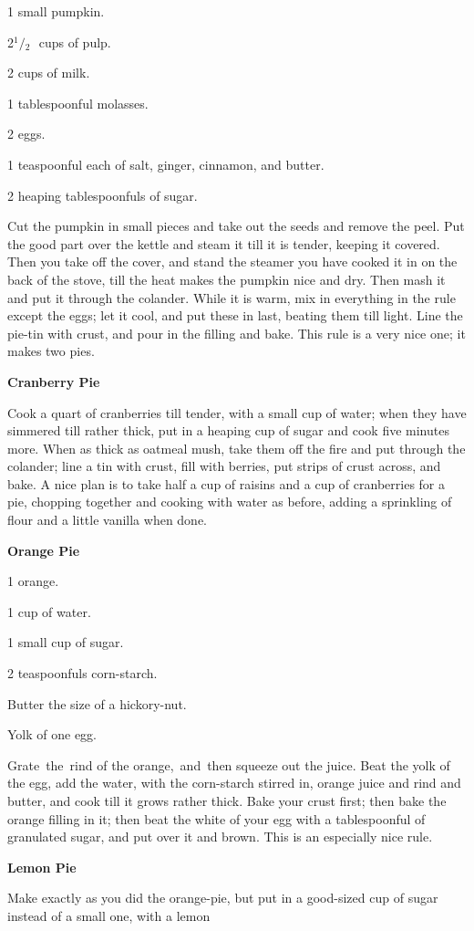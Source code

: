 \documentclass[11pt]{book}
\newcommand{\indpar}{\par\noindent\hspace*{\parindent}}
\newcommand{\ingredient}{\indpar}
\newcommand{\instruction}{\indpar}
\newcommand{\OneHalf}{\ensuremath{{}^1\!\!/\!{}_2\mbox{\ }}}
\newenvironment{RecipeTitle}{\medskip\begin{center}\large\bf }{\end{center}\smallskip}
\begin{document}
\ingredient  1 small pumpkin.
\ingredient  2\OneHalf cups of pulp.
\ingredient  2 cups of milk.
\ingredient  1 tablespoonful molasses.
\ingredient  2 eggs.
\ingredient  1 teaspoonful each of salt, ginger, cinnamon, and butter.
\ingredient  2 heaping tablespoonfuls of sugar.
\instruction  Cut the pumpkin in small pieces and take out the seeds and
remove the peel.  Put the good part over the kettle and steam
it till it is tender, keeping it covered.  Then you take off
the cover, and stand the steamer you have cooked it in on the
back of the stove, till the heat makes the pumpkin nice and
dry.  Then mash it and put it through the colander.  While it
is warm, mix in everything in the rule except the eggs; let it
cool, and put these in last, beating them till light.  Line
the pie-tin with crust, and pour in the filling and bake.
This rule is a very nice one; it makes two pies.
\begin{RecipeTitle}
Cranberry Pie\label{cranberry_pie}
\end{RecipeTitle}
\instruction  Cook a quart of cranberries till tender, with a small cup of
water; when they have simmered till rather thick, put in a
heaping cup of sugar and cook five minutes more.  When as
thick as oatmeal mush, take them off the fire and put through
the colander; line a tin with crust, fill with berries, put
strips of crust across, and bake.  A nice plan is to take half
a cup of raisins and a cup of cranberries for a pie, chopping
together and cooking with water as before, adding a sprinkling
of flour and a little vanilla when done.
\begin{RecipeTitle}
Orange Pie\label{orange_pie}
\end{RecipeTitle}
\ingredient  1 orange.
\ingredient  1 cup of water.
\ingredient  1 small cup of sugar.
\ingredient  2 teaspoonfuls corn-starch.
\ingredient  Butter the size of a hickory-nut.
\ingredient  Yolk of one egg.
\instruction  Grate\, the\, rind of the orange,\, and\, then squeeze out the juice.
Beat the yolk of the egg, add the water, with the corn-starch
stirred in, orange juice and rind and butter, and cook till it
grows rather thick.  Bake your crust first; then bake the
orange filling in it;  then beat the white of your egg with
a tablespoonful of granulated sugar, and put over it and brown.
This is an especially nice rule.
\begin{RecipeTitle}
Lemon Pie\label{lemon_pie}
\end{RecipeTitle}
\instruction  Make exactly as you did the orange-pie, but put in a
good-sized cup of sugar instead of a small one, with a lemon
\end{document}

